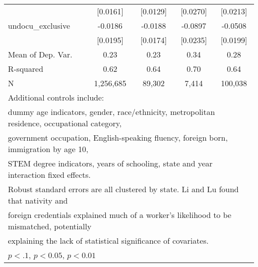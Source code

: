 \begin{table}[htbp]
\begin{tabular}{l*{4}{c}}
                    &    [0.0161]         &    [0.0129]         &    [0.0270]         &    [0.0213]         \\
\addlinespace
undocu\_exclusive    &     -0.0186         &     -0.0188         &     -0.0897\sym{***}&     -0.0508\sym{**} \\
                    &    [0.0195]         &    [0.0174]         &    [0.0235]         &    [0.0199]         \\
\midrule
Mean of Dep. Var.   &        0.23         &        0.23         &        0.34         &        0.28         \\
R-squared           &        0.62         &        0.64         &        0.70         &        0.64         \\
N                   &   1,256,685         &      89,302         &       7,414         &     100,038         \\
\bottomrule
\multicolumn{5}{l}{\footnotesize Additional controls include:}\\
\multicolumn{5}{l}{\footnotesize dummy age indicators, gender, race/ethnicity, metropolitan residence, occupational category,}\\
\multicolumn{5}{l}{\footnotesize government occupation, English-speaking fluency, foreign born, immigration by age 10,}\\
\multicolumn{5}{l}{\footnotesize STEM degree indicators, years of schooling, state and year interaction fixed effects.}\\
\multicolumn{5}{l}{\footnotesize Robust standard errors are all clustered by state. Li and Lu found that nativity and}\\
\multicolumn{5}{l}{\footnotesize foreign credentials explained much of a worker's likelihood to be mismatched, potentially}\\
\multicolumn{5}{l}{\footnotesize explaining the lack of statistical significance of covariates.}\\
\multicolumn{5}{l}{\footnotesize \sym{*} \(p<.1\), \sym{**} \(p<0.05\), \sym{***} \(p<0.01\)}\\
\end{tabular}
\end{table}
